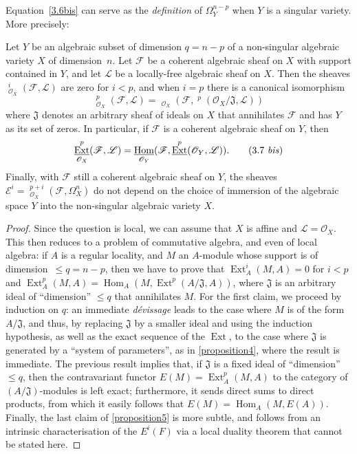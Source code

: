 \documentclass{article}
\theoremstyle{plain}
\newenvironment{proposition}[1]
  {\renewcommand\theinnercustomproposition{#1}\innercustomproposition}
  {\endinnercustomproposition}
\theoremstyle{definition}
\newcommand{\sh}{\mathscr}
\renewcommand{\leq}{\leqslant}
\DeclareMathOperator{\Ext}{Ext}
\DeclareMathOperator{\Hom}{Hom}
\DeclareMathOperator{\shExt}{\underline{Ext}}
\DeclareMathOperator{\shHom}{\underline{Hom}}
\newcommand{\oldpage}[1]{\marginpar{\footnotesize$\Big\vert$ \textit{p.~#1}}}
\begin{document}
Equation~\cref{3.6bis} can serve as the \emph{definition} of $\Omega_Y^{n-p}$ when $Y$ is a singular variety.
More precisely:

\begin{proposition}{5}
\label{proposition5}
  Let $Y$ be an algebraic subset of dimension $q=n-p$ of a non-singular algebraic variety $X$ of dimension~$n$.
  Let $\sh{F}$ be a coherent algebraic sheaf on $X$ with support contained in $Y$, and let $\sh{L}$ be a locally-free algebraic sheaf on $X$.
  Then the sheaves $\shExt_{\sh{O}_X}^i(\sh{F},\sh{L})$ are zero for $i<p$, and when $i=p$ there is a canonical isomorphism
  \[
  \label{3.7}
    \shExt_{\sh{O}_X}^p(\sh{F},\sh{L}) = \shHom_{\sh{O}_X}(\sh{F},\shExt^p(\sh{O}_X/\mathfrak{J},\sh{L}))
  \tag{3.7}
  \]
  where $\mathfrak{J}$ denotes an arbitrary sheaf of ideals on $X$ that annihilates $\sh{F}$ and has $Y$ as its set of zeros.
  In particular, if $\sh{F}$ is a coherent algebraic sheaf on $Y$, then
  \[
  \label{3.7bis}
    \shExt_{\sh{O}_X}^p(\sh{F},\sh{L}) = \shHom_{\sh{O}_Y}(\sh{F},\shExt^p(\sh{O}_Y,\sh{L})).
  \tag{3.7 \emph{bis}}
  \]
  Finally, with $\sh{F}$ still a coherent algebraic sheaf on $Y$, the sheaves $\sh{E}^i=\shExt_{\sh{O}_X}^{p+i}(\sh{F},\Omega_X^n)$ do not depend on the choice of immersion of the algebraic space $Y$ into the non-singular algebraic variety $X$.
\end{proposition}

\begin{proof}
  Since the question is local, we can assume that $X$ is affine and $\sh{L}=\sh{O}_X$.
  This then reduces to a problem of commutative algebra, and even of local algebra:
  if $A$ is a regular locality, and $M$ an $A$-module whose support is of dimension~$\leq q=n-p$, then we have to prove that $\Ext_A^i(M,A)=0$ for $i<p$ and $\Ext_A^p(M,A)=\Hom_A(M,\Ext^p(A/\mathfrak{J},A))$, where $\mathfrak{J}$ is an arbitrary ideal of ``dimension'' $\leq q$ that annihilates $M$.
  For the first claim, we proceed by induction on $q$:
  an immediate \emph{d\'{e}vissage} leads to the case where $M$ is of the form $A/\mathfrak{J}$, and thus, by replacing $\mathfrak{J}$ by a smaller ideal and using the induction hypothesis, as well as the exact sequence of the $\Ext$, to the case where $\mathfrak{J}$ is generated by a ``system of parameters'', as in \cref{proposition4}, where the result is immediate.
  The previous result implies that, if $\mathfrak{J}$ is a
\oldpage{149-09}
  fixed ideal of ``dimension'' $\leq q$, then the contravariant functor $E(M)=\Ext_A^p(M,A)$ to the category of $(A/\mathfrak{J})$-modules is left exact;
  furthermore, it sends direct sums to direct products, from which it easily follows that $E(M)=\Hom_A(M,E(A))$.
  Finally, the last claim of \cref{proposition5} is more subtle, and follows from an intrinsic characterisation of the $E^i(F)$ via a local duality theorem that cannot be stated here.
\end{proof}
\end{document}
